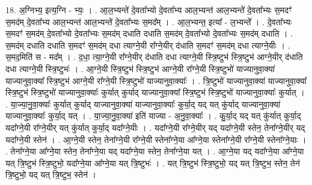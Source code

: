 \documentclass[17pt]{extarticle}
\begin{document}
18. अ॒ग्निभ्य॒ इत्य॒ग्नि - भ्यः॒ । . आ॒ल॒भ्यन्ते॑ दे॒वता᳚भ्यो दे॒वता᳚भ्य आल॒भ्यन्त॑ आल॒भ्यन्ते॑ दे॒वता᳚भ्यः स॒मदꣳ॑ स॒मद॑म् दे॒वता᳚भ्य आल॒भ्यन्त॑ आल॒भ्यन्ते॑ दे॒वता᳚भ्यः स॒मद᳚म् । . आ॒ल॒भ्यन्त॒ इत्या᳚ - ल॒भ्यन्ते᳚ । . दे॒वता᳚भ्यः स॒मदꣳ॑ स॒मद॑म् दे॒वता᳚भ्यो दे॒वता᳚भ्यः स॒मद॑म् दधाति दधाति स॒मद॑म् दे॒वता᳚भ्यो दे॒वता᳚भ्यः स॒मद॑म् दधाति । . स॒मद॑म् दधाति दधाति स॒मदꣳ॑ स॒मद॑म् दधा त्याग्ने॒यी रा᳚ग्ने॒यीर् द॑धाति स॒मदꣳ॑ स॒मद॑म् दधा त्याग्ने॒यीः । . स॒मद॒मिति॑ स - मद᳚म् । . द॒धा॒ त्या॒ग्ने॒यी रा᳚ग्ने॒यीर् द॑धाति दधा त्याग्ने॒यी स्त्रि॒ष्टुभ॑ स्त्रि॒ष्टुभ॑ आग्ने॒यीर् द॑धाति दधा त्याग्ने॒यी स्त्रि॒ष्टुभः॑ । . आ॒ग्ने॒यी स्त्रि॒ष्टुभ॑ स्त्रि॒ष्टुभ॑ आग्ने॒यी रा᳚ग्ने॒यी स्त्रि॒ष्टुभो॑ याज्यानुवा॒क्या॑ याज्यानुवा॒क्या᳚ स्त्रि॒ष्टुभ॑ आग्ने॒यी रा᳚ग्ने॒यी स्त्रि॒ष्टुभो॑ याज्यानुवा॒क्याः᳚ । . त्रि॒ष्टुभो॑ याज्यानुवा॒क्या॑ याज्यानुवा॒क्या᳚ स्त्रि॒ष्टुभ॑ स्त्रि॒ष्टुभो॑ याज्यानुवा॒क्याः᳚ कुर्यात् कुर्याद् याज्यानुवा॒क्या᳚ स्त्रि॒ष्टुभ॑ स्त्रि॒ष्टुभो॑ याज्यानुवा॒क्याः᳚ कुर्यात् । . या॒ज्या॒नु॒वा॒क्याः᳚ कुर्यात् कुर्याद् याज्यानुवा॒क्या॑ याज्यानुवा॒क्याः᳚ कुर्या॒द् यद् यत् कु॑र्याद् याज्यानुवा॒क्या॑ याज्यानुवा॒क्याः᳚ कुर्या॒द् यत् । . या॒ज्या॒नु॒वा॒क्या॑ इति॑ याज्या - अ॒नु॒वा॒क्याः᳚ । . कु॒र्या॒द् यद् यत् कु॑र्यात् कुर्या॒द् यदा᳚ग्ने॒यी रा᳚ग्ने॒यीर् यत् कु॑र्यात् कुर्या॒द् यदा᳚ग्ने॒यीः । . यदा᳚ग्ने॒यी रा᳚ग्ने॒यीर् यद् यदा᳚ग्ने॒यी स्तेन॒ तेना᳚ग्ने॒यीर् यद् यदा᳚ग्ने॒यी स्तेन॑ । . आ॒ग्ने॒यी स्तेन॒ तेना᳚ग्ने॒यी रा᳚ग्ने॒यी स्तेना᳚ग्ने॒या आ᳚ग्ने॒या स्तेना᳚ग्ने॒यी रा᳚ग्ने॒यी स्तेना᳚ग्ने॒याः । . तेना᳚ग्ने॒या आ᳚ग्ने॒या स्तेन॒ तेना᳚ग्ने॒या यद् यदा᳚ग्ने॒या स्तेन॒ तेना᳚ग्ने॒या यत् । . आ॒ग्ने॒या यद् यदा᳚ग्ने॒या आ᳚ग्ने॒या यत् त्रि॒ष्टुभ॑ स्त्रि॒ष्टुभो॒ यदा᳚ग्ने॒या आ᳚ग्ने॒या यत् त्रि॒ष्टुभः॑ । . यत् त्रि॒ष्टुभ॑ स्त्रि॒ष्टुभो॒ यद् यत् त्रि॒ष्टुभ॒ स्तेन॒ तेन॑ त्रि॒ष्टुभो॒ यद् यत् त्रि॒ष्टुभ॒ स्तेन॑ । \newline
\end{document}
